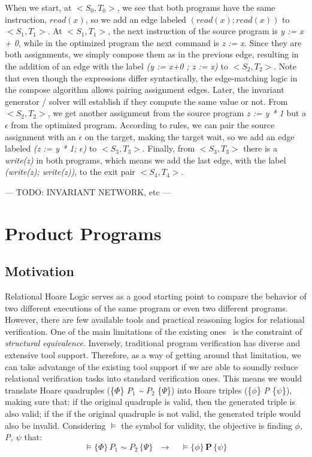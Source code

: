 When we start, at $<S_0, T_0>$, we see that both programs have the same instruction, $read(x)$, so we add an edge labeled $(read(x); read(x))$ to $<S_1, T_1>$.
At $<S_1, T_1>$, the next instruction of the source program is \emph{y := x + 0}, while in the optimized program the next command is \emph{z := x}.
Since they are both assignments, we simply compose them as in the previous edge, resulting in the addition of an edge with the label \emph{(y := x+0 ; z := x)} to $<S_2, T_2>$.
Note that even though the expressions differ syntactically, the edge-matching logic in the compose algorithm allows pairing assignment edges.
Later, the invariant generator / solver will establish if they compute the same value or not.
From $<S_2, T_2>$, we get another assignment from the source program \emph{z := y * 1} but a $\epsilon$ from the optimized program.
According to rules, we can pair the source assignment with an $\epsilon$ on the target, making the target wait, so we add an edge labeled \emph{(z := y * 1; $\epsilon$)} to $<S_3, T_3>$.
Finally, from $<S_3, T_3>$ there is a \emph{write(z)} in both programs, which means we add the last edge, with the label \emph{(write(z); write(z))}, to the exit pair $<S_4, T_4>$.

--- TODO: INVARIANT NETWORK, etc ---


\FloatBarrier
\section{Product Programs} 
\label{sec:product_programs}

\subsection{Motivation} 
\label{subsec:product_programs_motivation}

Relational Hoare Logic serves as a good starting point to compare the behavior of two different executions of the same program or even two different programs.
However, there are few available tools and practical reasoning logics for relational verification.
One of the main limitations of the existing ones~\cite{DBLP:conf/popl/Benton04, DBLP:journals/tcs/Yang07} is the constraint of \emph{structural equivalence}.
Inversely, traditional program verification has diverse and extensive tool support.
Therefore, as a way of getting around that limitation, we can take advatange of the existing tool support if we are able to soundly reduce relational verification tasks into standard verification ones.
This means we would translate Hoare quadruples (\{$\Phi$\} \emph{$P_1$} \emph{\textasciitilde} \emph{$P_2$} \{$\Psi$\}) into Hoare triples (\{$\phi$\} \emph{P} \{$\psi$\}), making sure that: if the original quadruple is valid, then the generated triple is also valid; if the if the original quadruple is not valid, the generated triple would also be invalid.
Considering $\vDash$ the symbol for validity, the objective is finding \emph{$\phi$, P, $\psi$} that:
\[ \vDash \{\Phi\} \, \textbf{$P_1$} \sim \textbf{$P_2$} \, \{\Psi\} \ \ \ \rightarrow \ \ \ \ \ \vDash \{\phi\} \, \textbf{P} \, \{\psi\} \]

